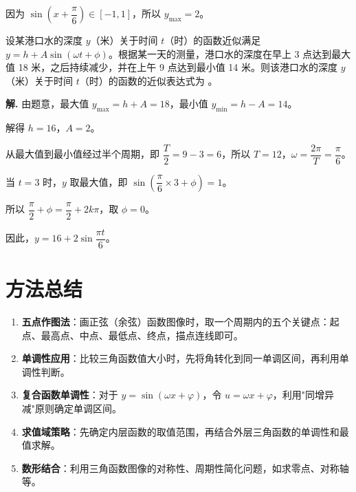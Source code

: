 \documentclass[11pt]{ctexrep}
\begin{document}
因为 $\sin\left(x + \dfrac{\pi}{6}\right) \in [-1, 1]$，所以 $y_{\max} = 2$。

\begin{realexam}[2025 静安高三二模]
    设某港口水的深度 $y$（米）关于时间 $t$（时）的函数近似满足 $y = h + A\sin(\omega t + \phi)$。根据某一天的测量，港口水的深度在早上 3 点达到最大值 18 米，之后持续减少，并在上午 9 点达到最小值 14 米。则该港口水的深度 $y$（米）关于时间 $t$（时）的函数的近似表达式为 \underline{\hspace{2cm}}。
\end{realexam}

\textbf{解.} 由题意，最大值 $y_{\max} = h + A = 18$，最小值 $y_{\min} = h - A = 14$。

解得 $h = 16$，$A = 2$。

从最大值到最小值经过半个周期，即 $\dfrac{T}{2} = 9 - 3 = 6$，所以 $T = 12$，$\omega = \dfrac{2\pi}{T} = \dfrac{\pi}{6}$。

当 $t = 3$ 时，$y$ 取最大值，即 $\sin\left(\dfrac{\pi}{6} \times 3 + \phi\right) = 1$。

所以 $\dfrac{\pi}{2} + \phi = \dfrac{\pi}{2} + 2k\pi$，取 $\phi = 0$。

因此，$y = 16 + 2\sin\dfrac{\pi t}{6}$。

\section*{方法总结}

\begin{enumerate}
    \item \textbf{五点作图法}：画正弦（余弦）函数图像时，取一个周期内的五个关键点：起点、最高点、中点、最低点、终点，描点连线即可。
    \item \textbf{单调性应用}：比较三角函数值大小时，先将角转化到同一单调区间，再利用单调性判断。
    \item \textbf{复合函数单调性}：对于 $y = \sin(\omega x + \varphi)$，令 $u = \omega x + \varphi$，利用"同增异减"原则确定单调区间。
    \item \textbf{求值域策略}：先确定内层函数的取值范围，再结合外层三角函数的单调性和最值求解。
    \item \textbf{数形结合}：利用三角函数图像的对称性、周期性简化问题，如求零点、对称轴等。
\end{enumerate}
\end{document}
